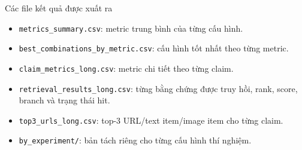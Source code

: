 \documentclass[aspectratio=169]{beamer}
\begin{document}
\begin{frame}{Các file kết quả được xuất ra}
  \begin{itemize}
    \item \texttt{metrics\_summary.csv}: metric trung bình của từng cấu hình.
    \item \texttt{best\_combinations\_by\_metric.csv}: cấu hình tốt nhất theo từng metric.
    \item \texttt{claim\_metrics\_long.csv}: metric chi tiết theo từng claim.
    \item \texttt{retrieval\_results\_long.csv}: từng bằng chứng được truy hồi, rank, score, branch và trạng thái hit.
    \item \texttt{top3\_urls\_long.csv}: top-3 URL/text item/image item cho từng claim.
    \item \texttt{by\_experiment/}: bản tách riêng cho từng cấu hình thí nghiệm.
  \end{itemize}
\end{frame}
\end{document}
